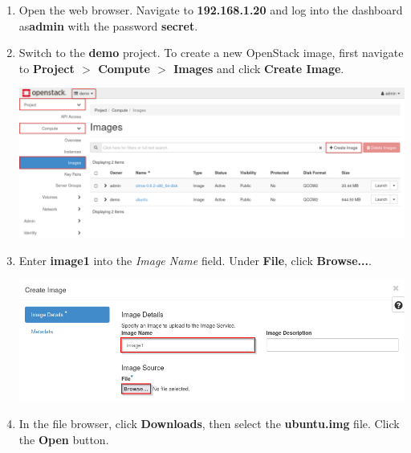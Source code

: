 \documentclass[letterpaper, 12pt]{article}
\begin{document}
\begin{enumerate}
    \item Open the web browser. Navigate to \textbf{192.168.1.20} and log into the dashboard as\textbf{admin} with the
    password \textbf{secret}.

    \item Switch to the \textbf{demo} project. To create a new OpenStack image, first navigate to
    \textbf{Project $>$ Compute $>$ Images} and click \textbf{Create Image}.

    \begin{center}
        \includegraphics[width=\linewidth]{images/part1/step2.png}
    \end{center}

    \item Enter \textbf{image1} into the \textit{Image Name} field. Under \textbf{File}, click \textbf{Browse...}.
    
    \begin{center}
        \includegraphics[width=\linewidth]{images/part1/step3.png}
    \end{center}

    \item In the file browser, click \textbf{Downloads}, then select the \textbf{ubuntu.img} file. Click the
    \textbf{Open} button.


\end{enumerate}
\end{document}
